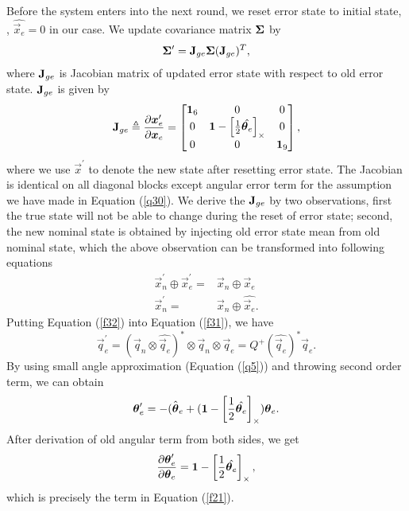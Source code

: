 Before the system enters into the next round, we reset error state to initial state, \ie, $\hat{\vec{x}_e} = 0$ in our case. We update covariance matrix $\mathbf{\Sigma}$ by
\begin{equation}\label{f20}
	\mathbf{\Sigma}^\prime = \mathbf{J}_{ge} \mathbf{\Sigma} (\mathbf{J}_{ge})^T,
\end{equation}
where $\mathbf{J}_{ge}$ is Jacobian matrix of updated error state with respect to old error state. $\mathbf{J}_{ge}$ is given by
\begin{equation}\label{f21}
	\mathbf{J}_{ge} \triangleq \dfrac{\partial{\boldsymbol{x}_e^\prime}}{\partial{\boldsymbol{x}_e}} = \begin{bmatrix}
	\mathbf{1}_6 & 0 & 0 \\
	0 & \mathbf{1} - \left[ \frac{1}{2} \hat{\boldsymbol{\theta}_e} \right]_\times & 0 \\
	0 & 0 & \mathbf{1}_9 \\
	\end{bmatrix},
\end{equation}
where we use $\vec{x}^\prime$ to denote the new state after resetting error state. The Jacobian is identical on all diagonal blocks except angular error term for the assumption we have made in Equation (\ref{q30}). We derive the $\mathbf{J}_{ge}$ by two observations, first the true state will not be able to change during the reset of error state; second, the new nominal state is obtained by injecting old error state mean from old nominal state, which the above observation can be transformed into following equations
\begin{align}
	\label{f31}
	\vec{x}_n^\prime \oplus \vec{x}_e^\prime =& \vec{x}_n \oplus \vec{x}_e \\
	\label{f32}
	\vec{x}_n^\prime =& \vec{x}_n \oplus \hat{\vec{x}_e}.
\end{align}
Putting Equation (\ref{f32}) into Equation (\ref{f31}), we have
\begin{equation}
	\vec{q}_e^\prime = (\vec{q}_n \otimes \hat{\vec{q}_e})^* \otimes \vec{q}_n \otimes \vec{q}_e = Q^+(\hat{\vec{q}_e})^*\vec{q}_e.
\end{equation}
By using small angle approximation (Equation (\ref{q5})) and throwing second order term, we can obtain 
\begin{equation}
	\boldsymbol{\theta}_e^\prime = -\hat{(\boldsymbol{\theta}_e} + (\mathbf{1} - \left[ \frac{1}{2} \hat{\boldsymbol{\theta}_e} \right]_\times)\boldsymbol{\theta}_e.
\end{equation}
After derivation of old angular term from both sides, we get 
\begin{equation}
	\dfrac{\partial{\boldsymbol{\theta}_e^\prime}}{\partial{\boldsymbol{\theta}_e}} = \mathbf{1} - \left[ \frac{1}{2} \hat{\boldsymbol{\theta}_e} \right]_\times,
\end{equation}
which is precisely the term in Equation (\ref{f21}).
